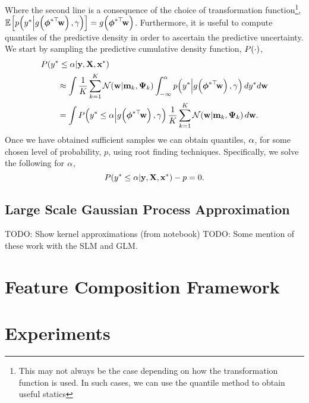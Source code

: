 \documentclass[11pt, oneside]{article}
\begin{document}
Where the second line is a consequence of the choice of transformation
function\footnote{This may not always be the case depending on how the
    transformation function is used. In such cases, we can use the quantile
    method to obtain useful statics},
$\mathbb{E}_{}\!\left[{p\!\left({y^{*}}\middle\vert{\ensuremath{{g}_{}\!\left({{\boldsymbol\phi^{*\top}\!\mathbf{w}}}\right)}, \ensuremath{\gamma}}\right)}\right] =
{g}_{}\!\left({{\boldsymbol\phi^{*\top}\!\mathbf{w}}}\right)$. Furthermore, it is useful to compute quantiles
of the predictive density in order to ascertain the predictive uncertainty. We
start by sampling the predictive cumulative density function, $P\!\left({\cdot}\right)$,
\begin{align}
    &\ProbC{\targs\test \leq \cdfAlph}{\targ, \ins, \inss\test} \nonumber\\ 
    &\qquad\approx \int 
    \frac{1}{K} \sum^K_{k=1} \gausC{\weights}{\pomean_k, \dpocov_k}
    \int^{\cdfAlph}_{-\infty} 
    \probC{\targs\test}{\activ{\feats\testT\weights}, \lparam}
    d \targs\test d \weights \nonumber\\
    &\qquad= \int
    \ProbC{\targs\test \leq \cdfAlph}{\activ{\feats\testT\weights}, \lparam}
    \frac{1}{K} \sum^K_{k=1} \gausC{\weights}{\pomean_k, \dpocov_k}
    d \weights.
    \label{eq:lapexpec}
\end{align}
Once we have obtained sufficient samples we can obtain quantiles, $\alpha$, 
for some chosen level of probability, $p$, using root finding techniques.
Specifically, we solve the following for $\alpha$,
\begin{equation}
    P\!\left({y^{*} \leq \alpha}\middle\vert{\ensuremath{\mathbf{y}}, \ensuremath{\mathbf{X}}, \ensuremath{\mathbf{x}}\ensuremath{^{*}}}\right) - p = 0.
\end{equation}

\subsection{Large Scale Gaussian Process Approximation}

TODO: Show kernel approximations (from notebook)
TODO: Some mention of these work with the SLM and GLM.


\section{Feature Composition Framework}

\section{Experiments}


\printbibliography%
\end{document}
